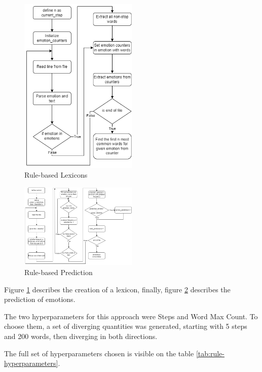 \begin{figure}[H]
    \centering
    \includegraphics*[width=0.5\textwidth]{images/rules-2.png}
    \caption{Rule-based Lexicons}
    \label{fig:rule-2}
\end{figure}

\begin{figure}[H]
    \centering
    \includegraphics*[width=0.5\textwidth]{images/rules-3.png}
    \caption{Rule-based Prediction}
    \label{fig:rule-3}
\end{figure}

Figure \ref{fig:rule-2} describes the creation of a lexicon, finally, figure \ref{fig:rule-3} describes the prediction of emotions.

The two hyperparameters for this approach were Steps and Word Max Count. To choose them, a set of diverging quantities was generated, starting with 5 steps and 200 words, then diverging in both directions.

The full set of hyperparameters chosen is visible on the table \ref{tab:rule-hyperparameters}.

